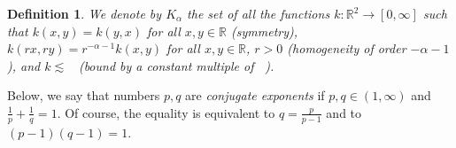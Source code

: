 \documentclass[12pt, a4paper]{amsart}
\newtheorem{definition}[theorem]{Definition}
\DeclareMathOperator{\Mass}{\nu_{\alpha}}
\newcommand{\R}{\mathbb{R}}
\begin{document}


\begin{definition}
We denote by \( K_\alpha \) the set of all the functions \( k : \mathbb{R}^2 \to [0, \infty] \) such that \( k(x, y) = k(y, x) \) for all \( x, y \in \mathbb{R} \) (symmetry), \( k(rx, ry) = r^{-\alpha - 1} k(x, y) \) for all \( x, y \in \mathbb{R} \), \( r > 0 \) (homogeneity of order \( -\alpha - 1 \)), and \( k \lesssim \Mass \) (bound by a constant multiple of $\Mass$).
\end{definition}


Below, we say that numbers \( p, q\)  are \textit{conjugate exponents} if \(p,q\in (1, \infty) \) and \( \frac{1}{p} + \frac{1}{q} = 1 \). 
Of course, the equality is equivalent to \( q = \frac{p}{p-1} \) and to \( (p-1)(q-1) = 1 \). 
\end{document}
